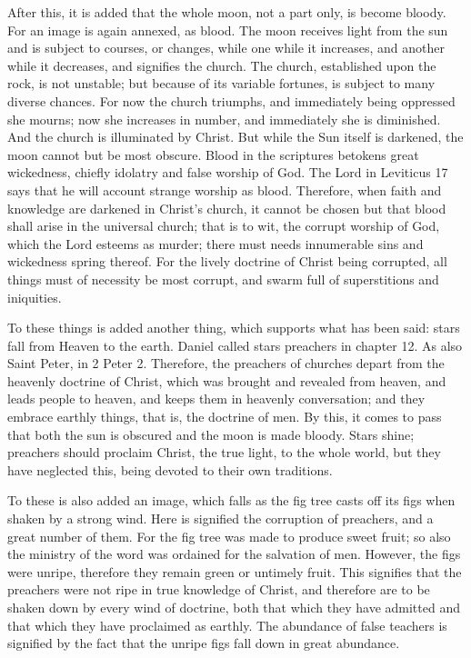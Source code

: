 After this, it is added that the whole moon, not a part only, is become bloody. For an image is again annexed, as blood. The moon receives light from the sun and is subject to courses, or changes, while one while it increases, and another while it decreases, and signifies the church. The church, established upon the rock, is not unstable; but because of its variable fortunes, is subject to many diverse chances. For now the church triumphs, and immediately being oppressed she mourns; now she increases in number, and immediately she is diminished. And the church is illuminated by Christ. But while the Sun itself is darkened, the moon cannot but be most obscure. Blood in the scriptures betokens great wickedness, chiefly idolatry and false worship of God. The Lord in Leviticus 17 says that he will account strange worship as blood. Therefore, when faith and knowledge are darkened in Christ’s church, it cannot be chosen but that blood shall arise in the universal church; that is to wit, the corrupt worship of God, which the Lord esteems as murder; there must needs innumerable sins and wickedness spring thereof. For the lively doctrine of Christ being corrupted, all things must of necessity be most corrupt, and swarm full of superstitions and iniquities.

To these things is added another thing, which supports what has been said: stars fall from Heaven to the earth. Daniel called stars preachers in chapter 12. As also Saint Peter, in 2 Peter 2. Therefore, the preachers of churches depart from the heavenly doctrine of Christ, which was brought and revealed from heaven, and leads people to heaven, and keeps them in heavenly conversation; and they embrace earthly things, that is, the doctrine of men. By this, it comes to pass that both the sun is obscured and the moon is made bloody. Stars shine; preachers should proclaim Christ, the true light, to the whole world, but they have neglected this, being devoted to their own traditions.

To these is also added an image, which falls as the fig tree casts off its figs when shaken by a strong wind. Here is signified the corruption of preachers, and a great number of them. For the fig tree was made to produce sweet fruit; so also the ministry of the word was ordained for the salvation of men. However, the figs were unripe, therefore they remain green or untimely fruit. This signifies that the preachers were not ripe in true knowledge of Christ, and therefore are to be shaken down by every wind of doctrine, both that which they have admitted and that which they have proclaimed as earthly. The abundance of false teachers is signified by the fact that the unripe figs fall down in great abundance.

